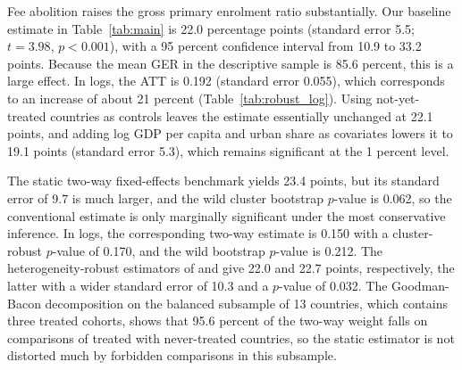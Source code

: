 \documentclass[12pt]{article}
\begin{document}
Fee abolition raises the gross primary enrolment ratio substantially. Our baseline estimate in Table~\ref{tab:main} is 22.0 percentage points (standard error 5.5; $t = 3.98$, $p < 0.001$), with a 95 percent confidence interval from 10.9 to 33.2 points.
Because the mean GER in the descriptive sample is 85.6 percent, this is a large effect. In logs, the ATT is 0.192 (standard error 0.055), which corresponds to an increase of about 21 percent (Table~\ref{tab:robust_log}).
Using not-yet-treated countries as controls leaves the estimate essentially unchanged at 22.1 points, and adding log GDP per capita and urban share as covariates lowers it to 19.1 points (standard error 5.3), which remains significant at the 1 percent level.



The static two-way fixed-effects benchmark yields 23.4 points, but its standard error of 9.7 is much larger, and the wild cluster bootstrap $p$-value is 0.062, so the conventional estimate is only marginally significant under the most conservative inference.
In logs, the corresponding two-way estimate is 0.150 with a cluster-robust $p$-value of 0.170, and the wild bootstrap $p$-value is 0.212.
The heterogeneity-robust estimators of \citet{sun2021estimating} and \citet{borusyak2024revisiting} give 22.0 and 22.7 points, respectively, the latter with a wider standard error of 10.3 and a $p$-value of 0.032.
The Goodman-Bacon decomposition on the balanced subsample of 13 countries, which contains three treated cohorts, shows that 95.6 percent of the two-way weight falls on comparisons of treated with never-treated countries, so the static estimator is not distorted much by forbidden comparisons in this subsample.
\end{document}
